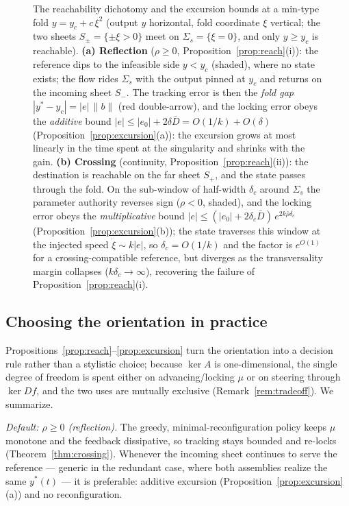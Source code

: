 \documentclass[11pt,american]{article}
\theoremstyle{definition}
\theoremstyle{plain}
\theoremstyle{remark}
\begin{document}
\begin{figure}[htbp]
\caption{The reachability dichotomy and the excursion bounds at a min-type fold
$y=y_c+c\,\xi^2$ (output $y$ horizontal, fold coordinate $\xi$ vertical; the two
sheets $S_\pm=\{\pm\xi>0\}$ meet on $\Sigma_s=\{\xi=0\}$, and only $y\ge y_c$ is
reachable). \textbf{(a) Reflection} ($\rho\ge0$, Proposition~\ref{prop:reach}(i)):
the reference dips to the infeasible side $y<y_c$ (shaded), where no state exists;
the flow rides $\Sigma_s$ with the output pinned at $y_c$ and returns on the
incoming sheet $S_-$. The tracking error is then the \emph{fold gap}
$|y^*-y_c|=|e|\,\|b\|$ (red double-arrow), and the locking error obeys the
\emph{additive} bound $|e|\le|e_0|+2\delta\bar D=O(1/k)+O(\delta)$
(Proposition~\ref{prop:excursion}(a)): the excursion grows at most linearly in the
time spent at the singularity and shrinks with the gain. \textbf{(b) Crossing}
(continuity, Proposition~\ref{prop:reach}(ii)): the destination is reachable on the
far sheet $S_+$, and the state passes through the fold. On the sub-window of
half-width $\delta_c$ around $\Sigma_s$ the parameter authority reverses sign
($\rho<0$, shaded), and the locking error obeys the \emph{multiplicative} bound
$|e|\le(|e_0|+2\delta_c\bar D)\,e^{2k\bar\rho\delta_c}$
(Proposition~\ref{prop:excursion}(b)); the state traverses this window at the
injected speed $\dot\xi\sim k|e|$, so $\delta_c=O(1/k)$ and the factor is
$e^{O(1)}$ for a crossing-compatible reference, but diverges as the transversality
margin collapses ($k\delta_c\to\infty$), recovering the failure of
Proposition~\ref{prop:reach}(i).}
\label{fig:excursion}
\end{figure}

\subsection{Choosing the orientation in practice}\label{sec:orientation}

Propositions~\ref{prop:reach}--\ref{prop:excursion} turn the orientation into a decision rule rather than a stylistic choice; because $\ker A$ is one-dimensional, the single degree of freedom is spent either on advancing/locking $\mu$ or on steering through $\ker Df$, and the two uses are mutually exclusive (Remark~\ref{rem:tradeoff}). We summarize.

\emph{Default: $\rho\ge0$ (reflection).} The greedy, minimal-reconfiguration policy keeps $\mu$ monotone and the feedback dissipative, so tracking stays bounded and re-locks (Theorem~\ref{thm:crossing}). Whenever the incoming sheet continues to serve the reference --- generic in the redundant case, where both assemblies realize the same $y^*(t)$ --- it is preferable: additive excursion (Proposition~\ref{prop:excursion}(a)) and no reconfiguration.
\end{document}
